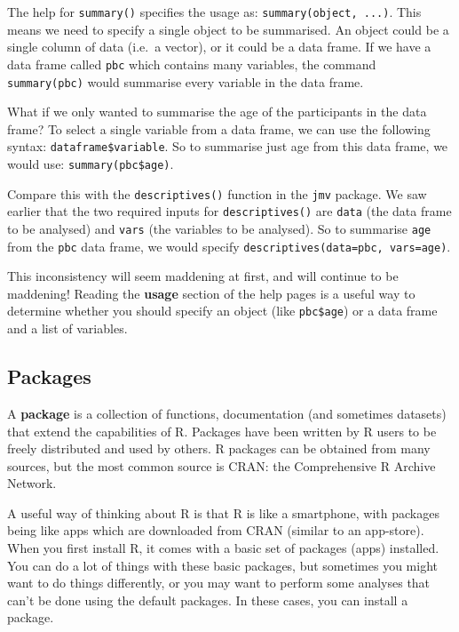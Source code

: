 \documentclass[
]{memoir}
\begin{document}
The help for \texttt{summary()} specifies the usage as: \texttt{summary(object,\ ...)}. This means we need to specify a single object to be summarised. An object could be a single column of data (i.e.~a vector), or it could be a data frame. If we have a data frame called \texttt{pbc} which contains many variables, the command \texttt{summary(pbc)} would summarise every variable in the data frame.

What if we only wanted to summarise the age of the participants in the data frame? To select a single variable from a data frame, we can use the following syntax: \texttt{dataframe\$variable}. So to summarise just age from this data frame, we would use: \texttt{summary(pbc\$age)}.

Compare this with the \texttt{descriptives()} function in the \texttt{jmv} package. We saw earlier that the two required inputs for \texttt{descriptives()} are \texttt{data} (the data frame to be analysed) and \texttt{vars} (the variables to be analysed). So to summarise \texttt{age} from the \texttt{pbc} data frame, we would specify \texttt{descriptives(data=pbc,\ vars=age)}.

This inconsistency will seem maddening at first, and will continue to be maddening! Reading the \textbf{usage} section of the help pages is a useful way to determine whether you should specify an object (like \texttt{pbc\$age}) or a data frame and a list of variables.

\hypertarget{packages}{%
\subsection{Packages}\label{packages}}

A \textbf{package} is a collection of functions, documentation (and sometimes datasets) that extend the capabilities of R. Packages have been written by R users to be freely distributed and used by others. R packages can be obtained from many sources, but the most common source is CRAN: the Comprehensive R Archive Network.

A useful way of thinking about R is that R is like a smartphone, with packages being like apps which are downloaded from CRAN (similar to an app-store). When you first install R, it comes with a basic set of packages (apps) installed. You can do a lot of things with these basic packages, but sometimes you might want to do things differently, or you may want to perform some analyses that can't be done using the default packages. In these cases, you can install a package.
\end{document}

